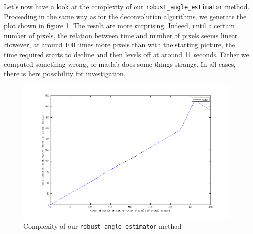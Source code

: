 \documentclass{article}
\begin{document}
Let's now have a look at the complexity of our \texttt{robust\_angle\_estimator} method. Proceeding in the same way as for the deconvolution algorithms, we generate the plot shown in figure \ref{fig:ComplexityRadon}. The result are more surprising. Indeed, until a certain number of pixels, the relation between time and number of pixels seems linear. However, at around 100 times more pixels than with the starting picture, the time required starts to decline and then levels off at around 11 seconds. Either we computed something wrong, or matlab does some things strange. In all cases, there is here possibility for investigation.


\begin{figure}[h!]
\centering
\includegraphics[scale=0.4]{../Images/ComplexityRadon.png}
\caption{Complexity of our \texttt{robust\_angle\_estimator} method}
\label{fig:ComplexityRadon}
\end{figure}
\end{document}

